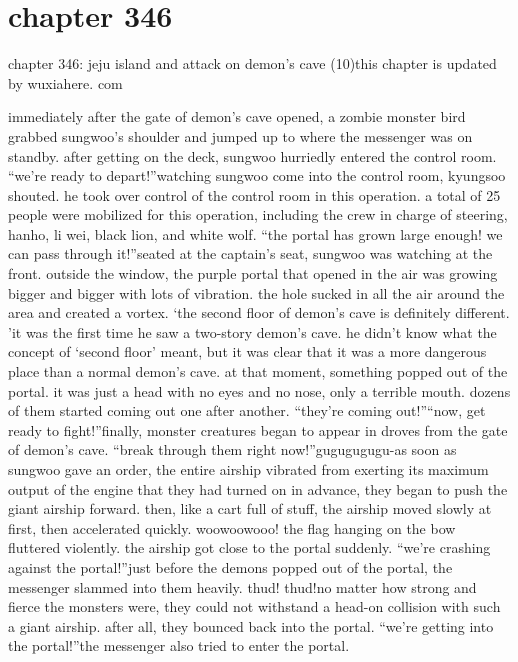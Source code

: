 \section{chapter 346}

chapter 346: jeju island and attack on demon’s cave (10)this chapter is updated by wuxiahere.
com




immediately after the gate of demon’s cave opened, a zombie monster bird grabbed sungwoo’s shoulder and jumped up to where the messenger was on standby.
after getting on the deck, sungwoo hurriedly entered the control room.
“we’re ready to depart!”watching sungwoo come into the control room, kyungsoo shouted.
 he took over control of the control room in this operation.
 a total of 25 people were mobilized for this operation, including the crew in charge of steering, hanho, li wei, black lion, and white wolf.
“the portal has grown large enough! we can pass through it!”seated at the captain’s seat, sungwoo was watching at the front.
 outside the window, the purple portal that opened in the air was growing bigger and bigger with lots of vibration.
 the hole sucked in all the air around the area and created a vortex.
‘the second floor of demon’s cave is definitely different.
’it was the first time he saw a two-story demon’s cave.
 he didn’t know what the concept of ‘second floor’ meant, but it was clear that it was a more dangerous place than a normal demon’s cave.
at that moment, something popped out of the portal.
 it was just a head with no eyes and no nose, only a terrible mouth.
 dozens of them started coming out one after another.
“they’re coming out!”“now, get ready to fight!”finally, monster creatures began to appear in droves from the gate of demon’s cave.
“break through them right now!”gugugugugu-as soon as sungwoo gave an order, the entire airship vibrated from exerting its maximum output of the engine that they had turned on in advance, they began to push the giant airship forward.
 then, like a cart full of stuff, the airship moved slowly at first, then accelerated quickly.
woowoowooo!
the flag hanging on the bow fluttered violently.
 the airship got close to the portal suddenly.
“we’re crashing against the portal!”just before the demons popped out of the portal, the messenger slammed into them heavily.
thud! thud!no matter how strong and fierce the monsters were, they could not withstand a head-on collision with such a giant airship.
 after all, they bounced back into the portal.
“we’re getting into the portal!”the messenger also tried to enter the portal.
